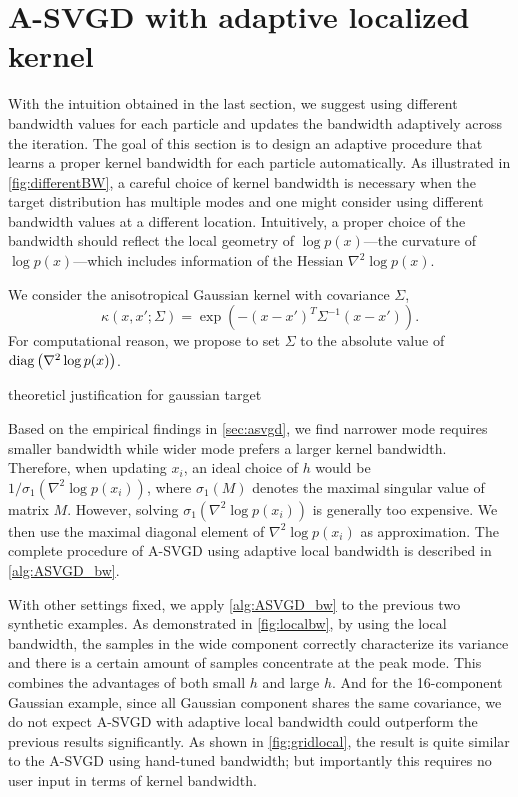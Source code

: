 \section{A-SVGD with adaptive localized kernel} \label{sec:bw}
With the intuition obtained in the last section, we suggest using different bandwidth values for each particle and updates the bandwidth adaptively across the iteration.
The goal of this section is to design an adaptive procedure that learns a proper kernel bandwidth for each particle automatically.    
As illustrated in  \cref{fig:differentBW}, a careful choice of kernel bandwidth is necessary when the target distribution has multiple modes and one might consider using different bandwidth values at a different location.  Intuitively, a proper choice of the bandwidth should reflect the local geometry of   $\log p(x)$---the curvature of $\log p(x)$---which includes information of the Hessian $\nabla^2 \log p(x)$.  

We consider the anisotropical Gaussian kernel with covariance $\Sigma$,
\[
\kappa(x, x'; \Sigma) = \exp(-(x - x')^T \Sigma^{-1}(x- x')  ).  
\]
For computational reason, we propose to set $\Sigma $ to the absolute value of $\operatorname{diag} \left(\nabla^2 \log p(x) \right)$.


\bnprop
theoreticl justification for gaussian target
\enprop


Based on the empirical findings in \cref{sec:asvgd}, we find narrower mode requires smaller bandwidth while wider mode prefers a larger kernel bandwidth. 
Therefore, when updating $x_i$, an ideal choice of $h$ would be $1/ \sigma_1(\nabla^2 \log p(x_i))$, where $\sigma_1(M)$ denotes the maximal singular value of matrix $M$. However, solving  $\sigma_1(\nabla^2 \log p(x_i))$ is generally too expensive. We then use the maximal diagonal element of $\nabla^2 \log p(x_i)$ as approximation. The complete procedure of A-SVGD using adaptive local bandwidth is described in \cref{alg:ASVGD_bw}.

With other settings fixed, we apply \cref{alg:ASVGD_bw} to the previous two synthetic examples. As demonstrated in \cref{fig:localbw}, by using the local bandwidth, the samples in the wide component correctly characterize its variance and there is a certain amount of samples concentrate at the peak mode. This combines the advantages of both small $h$ and large $h$. And for the 16-component Gaussian example, since all Gaussian component shares the same covariance, we do not expect  A-SVGD with adaptive local bandwidth could outperform the previous results significantly. As shown in \cref{fig:gridlocal}, the result is quite similar to the A-SVGD using hand-tuned bandwidth; but importantly this  requires no user input in terms of kernel bandwidth.

